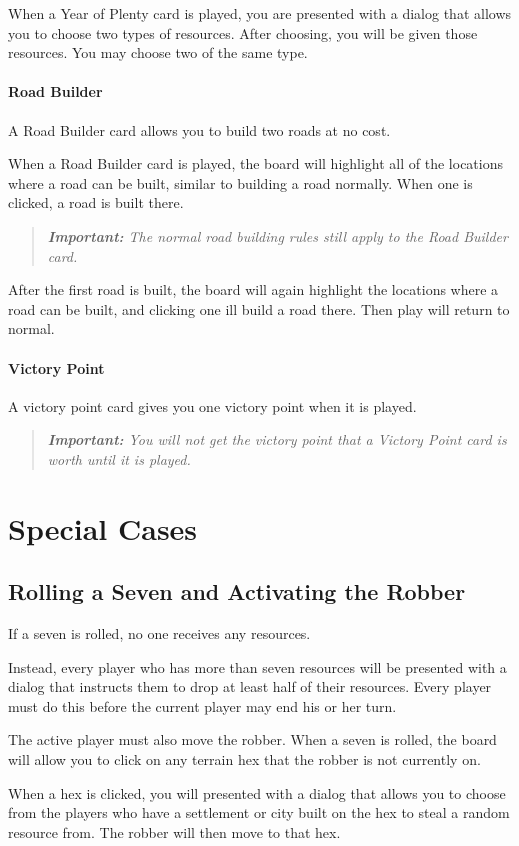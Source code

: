 \documentclass[12pt,letterpaper,titlepage]{article}
\newcommand\note[1]{\begin{quote}\emph{\textbf{Important:} #1}\end{quote}}
\begin{document}
			When a Year of Plenty card is played, you are presented with a dialog that allows you to choose two types of resources. After choosing, you will be given those resources. You may choose two of the same type.
			
			\paragraph{Road Builder}
			A Road Builder card allows you to build two roads at no cost.
			
			When a Road Builder card is played, the board will highlight all of the locations where a road can be built, similar to building a road normally. When one is clicked, a road is built there. 
			
			\note{The normal road building rules still apply to the Road Builder card.}
			
			After the first road is built, the board will again highlight the locations where a road can be built, and clicking one ill build a road there. Then play will return to normal.
			
			\paragraph{Victory Point}
			A victory point card gives you one victory point when it is played.
			
			\note{You will not get the victory point that a Victory Point card is worth until it is played.}

\section{Special Cases}
	\subsection{Rolling a Seven and Activating the Robber}
	If a seven is rolled, no one receives any resources.
		
	Instead, every player who has more than seven resources will be presented with a dialog that instructs them to drop at least half of their resources. Every player must do this before the current player may end his or her turn.
		
	The active player must also move the robber. When a seven is rolled, the board will allow you to click on any terrain hex that the robber is not currently on.
	
	When a hex is clicked, you will presented with a dialog that allows you to choose from the players who have a settlement or city built on the hex to steal a random resource from. The robber will then move to that hex.
	
\end{document}

